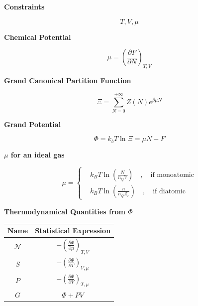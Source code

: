 \documentclass{article}
\begin{document}
\newpage
\begin{tcolorbox}[colframe=gray!90, colback=gray!5, coltitle=white, sharp corners, title=\textbf{Grand Canonical Ensamble, Summary}, fonttitle=\large\bfseries]

    \textbf{Constraints}

    \begin{equation}
        T, V, \mu
    \end{equation}

    \textbf{Chemical Potential}

    \begin{equation}
        \mu = \left( \frac{\partial F}{\partial N} \right)_{T,V}
    \end{equation}

    \textbf{Grand Canonical Partition Function}

    \begin{equation}
        \Xi = \sum_{N=0}^{+\infty} Z(N)e^{\beta\mu N}
    \end{equation}

    \textbf{Grand Potential}

    \begin{equation}
        \Phi = k_bT\ln{\Xi} = \mu N - F
    \end{equation}

    \textbf{\(\mu \) for an ideal gas}

    \begin{equation}
        \mu=
        \left\{
        \begin{aligned}
             & k_BT\ln{\left( \frac{N}{n_QV} \right)} \quad , \quad \text{if monoatomic}  \\
             & k_BT\ln{\left( \frac{n}{n_Q Z_r} \right)} \quad , \quad \text{if diatomic}
        \end{aligned}
        \right.
    \end{equation}

    \vspace{0.3cm}
    \textbf{Thermodynamical Quantities from \(\Phi \)}

    \begin{center}
        \begin{tabular}{|c|c|}
            \hline
            \textbf{Name}     & \textbf{Statistical Expression}                                \\ \hline
            \( \mathcal{N} \) & \( -\left( \frac{\partial \Phi}{\partial \mu} \right)_{T,V} \) \\ \hline
            \( S \)           & \( -\left( \frac{\partial \Phi}{\partial T} \right)_{V,\mu} \) \\ \hline
            \( P \)           & \( -\left( \frac{\partial \Phi}{\partial V} \right)_{T,\mu} \) \\ \hline
            \( G \)           & \( \Phi + PV \)                                                \\ \hline
        \end{tabular}
    \end{center}

\end{tcolorbox}
\newpage
\end{document}

